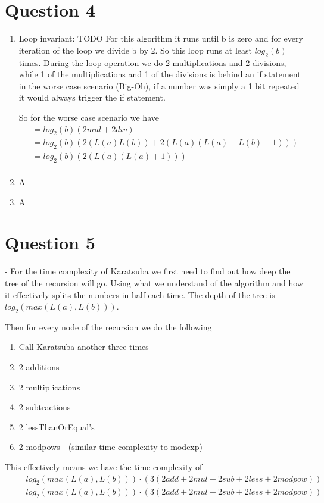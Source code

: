 \documentclass[journal,a4paper]{IEEEtran}
\begin{document}
\section*{Question 4}
\begin{enumerate}
	\item Loop invariant: TODO
		  For this algorithm it runs until b is zero and for every iteration of the loop we divide b by 2. So this loop runs at least $log_2(b)$ times. During the loop operation we do 2 multiplications and 2 divisions, while 1 of the multiplications and 1 of the divisions is behind an if statement in the worse case scenario (Big-Oh), if a number was simply a 1 bit repeated it would always trigger the if statement.
		  
		  So for the worse case scenario we have
		  \begin{align*}
		  	&= log_2(b)(2mul + 2div) \\
		  	&= log_2(b)(2(L(a)L(b)) + 2(L(a)(L(a)-L(b)+1))) \\
		  	&= log_2(b)(2(L(a)(L(a)+1))) \\
		  \end{align*}
	\item A
	\item A
\end{enumerate}

\section*{Question 5}
- For the time complexity of Karatsuba we first need to find out how deep the tree of the recursion will go. Using what we understand of the algorithm and how it effectively splits the numbers in half each time. The depth of the tree is $log_2(max(L(a),L(b)))$.

Then for every node of the recursion we do the following
\begin{enumerate}
	\item Call Karatsuba another three times
	\item 2 additions
	\item 2 multiplications
	\item 2 subtractions
	\item 2 lessThanOrEqual's
	\item 2 modpows - (similar time complexity to modexp)	
\end{enumerate}

This effectively means we have the time complexity of
\begin{align*}
	&= log_2(max(L(a),L(b)))\cdot \left( 3(2add+2mul+2sub+2less+2modpow) \right) \\
	&= log_2(max(L(a),L(b)))\cdot \left( 3(2add+2mul+2sub+2less+2modpow) \right) \\
\end{align*}
\end{document}

